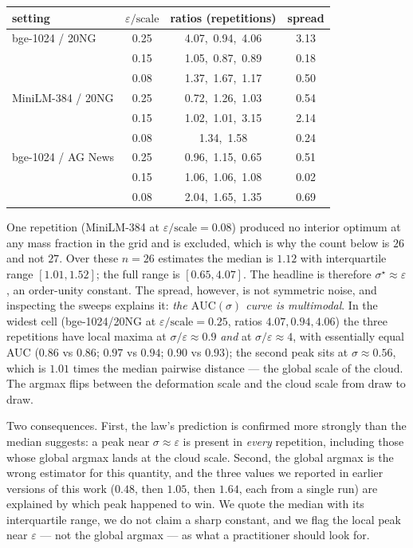 \documentclass[11pt]{article}
\theoremstyle{remark}
\begin{document}
\begin{center}
\begin{tabular}{lccc}
\toprule
setting & $\varepsilon/\text{scale}$ & ratios (repetitions) & spread\\
\midrule
bge-1024 / 20NG    & 0.25 & 4.07,\ 0.94,\ 4.06 & 3.13\\
                   & 0.15 & 1.05,\ 0.87,\ 0.89 & 0.18\\
                   & 0.08 & 1.37,\ 1.67,\ 1.17 & 0.50\\
MiniLM-384 / 20NG  & 0.25 & 0.72,\ 1.26,\ 1.03 & 0.54\\
                   & 0.15 & 1.02,\ 1.01,\ 3.15 & 2.14\\
                   & 0.08 & 1.34,\ 1.58        & 0.24\\
bge-1024 / AG News & 0.25 & 0.96,\ 1.15,\ 0.65 & 0.51\\
                   & 0.15 & 1.06,\ 1.06,\ 1.08 & 0.02\\
                   & 0.08 & 2.04,\ 1.65,\ 1.35 & 0.69\\
\bottomrule
\end{tabular}
\end{center}

One repetition (MiniLM-384 at $\varepsilon/\text{scale}=0.08$) produced no interior optimum at any
mass fraction in the grid and is excluded, which is why the count below is $26$ and not $27$.
Over these $n=26$ estimates the median is $1.12$ with interquartile range $[1.01,1.52]$; the full
range is $[0.65,4.07]$. The headline is therefore $\sigma^\star\approx\varepsilon$, an order-unity
constant. The spread, however, is not symmetric noise, and inspecting the sweeps explains it:
\emph{the $\mathrm{AUC}(\sigma)$ curve is multimodal}. In the widest cell (bge-1024/20NG at
$\varepsilon/\text{scale}=0.25$, ratios $4.07,0.94,4.06$) the three repetitions have local maxima at
$\sigma/\varepsilon\approx0.9$ \emph{and} at $\sigma/\varepsilon\approx4$, with essentially equal
AUC ($0.86$ vs $0.86$; $0.97$ vs $0.94$; $0.90$ vs $0.93$); the second peak sits at
$\sigma\approx0.56$, which is $1.01$ times the median pairwise distance --- the global scale of the
cloud. The argmax flips between the deformation scale and the cloud scale from draw to draw.

Two consequences. First, the law's prediction is confirmed more strongly than the median suggests:
a peak near $\sigma\approx\varepsilon$ is present in \emph{every} repetition, including those whose
global argmax lands at the cloud scale. Second, the global argmax is the wrong estimator for this
quantity, and the three values we reported in earlier versions of this work ($0.48$, then $1.05$,
then $1.64$, each from a single run) are explained by which peak happened to win. We quote the
median with its interquartile range, we do not claim a sharp constant, and we flag the local peak
near $\varepsilon$ --- not the global argmax --- as what a practitioner should look for.
\end{document}
